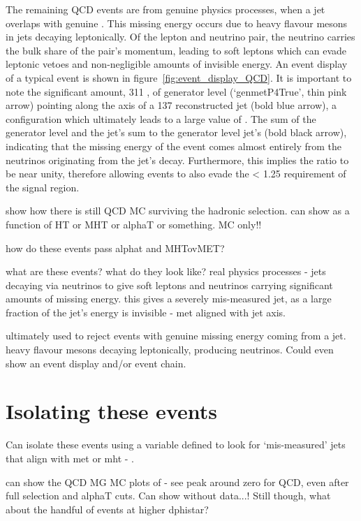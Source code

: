 The remaining QCD events are from genuine physics processes, when a jet overlaps
with genuine \met. This missing energy occurs due to heavy flavour mesons in
jets decaying leptonically. Of the lepton and neutrino pair, the neutrino
carries the bulk share of the pair's momentum, leading to soft leptons which
can evade leptonic vetoes and non-negligible amounts of invisible energy. An
event display of a typical event is shown in figure~\ref{fig:event_display_QCD}.
It is important to note the significant amount, 311 \gev, of generator level
\met (`genmetP4True', thin pink arrow) pointing along the axis of a 137
\gev \Pt reconstructed jet (bold blue arrow), a configuration which ultimately
leads to a large value of \alphat. The sum of the generator level \met \Pt and
the jet's \Pt sum to the generator level jet's \Pt (bold black arrow),
indicating that the missing energy of the event comes almost entirely from the
neutrinos originating from the jet's decay. Furthermore, this implies the ratio
\mhtmet to be near unity, therefore allowing events to also evade the \mhtmet <
1.25 requirement of the signal region.


show how there is still QCD MC surviving the hadronic selection. can show as a
function of HT or MHT or alphaT or something. MC only!!

how do these events pass alphat and MHTovMET?

what are these events? what do they look like? real physics processes - jets
decaying via neutrinos to give soft leptons and neutrinos carrying significant
amounts of missing energy. this gives a severely mis-measured jet, as a
large fraction of the jet's energy is invisible - met aligned with jet axis.

ultimately used to reject events with genuine missing energy coming from a jet.
heavy flavour mesons decaying leptonically, producing neutrinos. Could even show
an event display and/or event chain.

\section{Isolating these events}

Can isolate these events using a variable defined to look for `mis-measured'
jets that align with met or mht - \mindphistar.

can show the QCD MG MC plots of \dphistar - see peak around zero for QCD, even
after full selection and alphaT cuts. Can show without data...! Still though,
what about the handful of events at higher dphistar?

